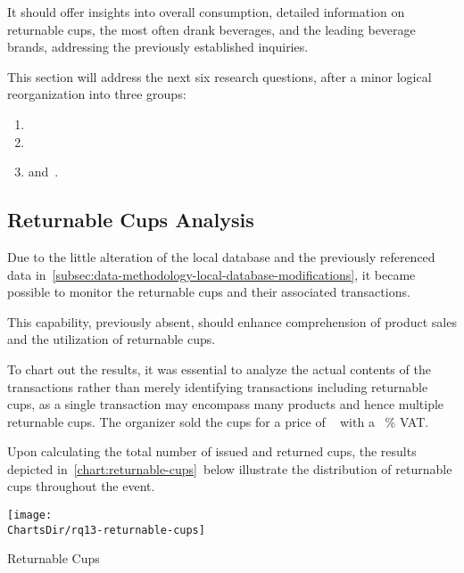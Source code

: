 It should offer insights into overall consumption, detailed information on returnable cups, the most often drank beverages, and the leading beverage brands, addressing the previously established inquiries.

This section will address the next six research questions, after a minor logical reorganization into three groups:
\begin{enumerate}
	\item {}
	\item {}
	\item and~.
\end{enumerate}


\subsection{Returnable Cups Analysis}
\label{subsec:analysis-beverage-returnable-cups}

Due to the little alteration of the local database and the previously referenced data in~\autoref{subsec:data-methodology-local-database-modifications}, it became possible to monitor the returnable cups and their associated transactions.

This capability, previously absent, should enhance comprehension of product sales and the utilization of returnable cups.


To chart out the results, it was essential to analyze the actual contents of the transactions rather than merely identifying transactions including returnable cups,
as a single transaction may encompass many products and hence multiple returnable cups.
The organizer sold the cups for a price of ~ with a ~\% VAT.\

Upon calculating the total number of issued and returned cups, the results depicted in~\autoref{chart:returnable-cups}~below illustrate the distribution of returnable cups throughout the event.

\begin{chart}[H]
	\centering
	\texttt{[image: \\ChartsDir/rq13-returnable-cups]}
	\caption{ Returnable Cups}
	\label{chart:returnable-cups}
	\source
\end{chart}

